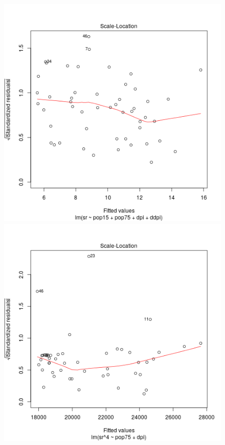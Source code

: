 \begin{figure}[p]
  \begin{center}
    \includegraphics[scale=0.48]{imgR/plot13.png} \hspace*{2cm}
	\includegraphics[scale=0.48]{imgR/plot23.png} \\

\end{center}
\end{figure}
